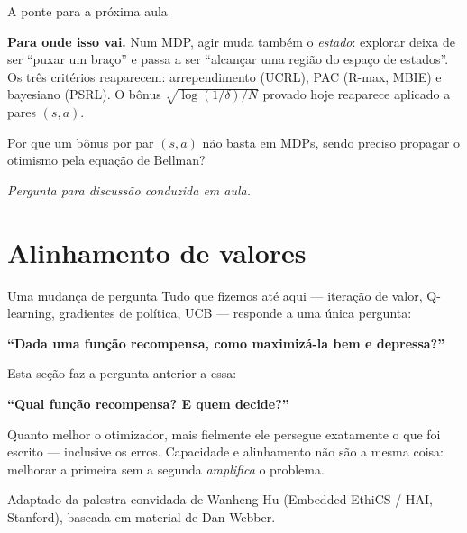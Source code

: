 \documentclass[aspectratio=169, 11pt]{beamer}
\newcommand{\paradiscussao}{\smallskip
  {\footnotesize\color{rlCinza}\itshape Pergunta para discussão conduzida em aula.}}
\begin{document}
\begin{frame}{A ponte para a próxima aula}
  \begin{ideiabox}
    \textbf{Para onde isso vai.} Num MDP, agir muda também o \emph{estado}:
    explorar deixa de ser ``puxar um braço'' e passa a ser ``alcançar uma
    região do espaço de estados''. Os três critérios reaparecem: arrependimento
    (UCRL), PAC (R-max, MBIE) e bayesiano (PSRL). O bônus
    $\sqrt{\log(1/\delta)/N}$ provado hoje reaparece aplicado a pares $(s,a)$.
  \end{ideiabox}

  \begin{quizbox}{}
    Por que um bônus por par $(s,a)$ não basta em MDPs, sendo preciso propagar
    o otimismo pela equação de Bellman?
  \end{quizbox}
  \paradiscussao
\end{frame}

\section{Alinhamento de valores}

\begin{frame}{Uma mudança de pergunta}
  Tudo que fizemos até aqui --- iteração de valor, Q-learning, gradientes de
  política, UCB --- responde a uma única pergunta:

  \begin{center}
    {\large\color{rlAzul}\bfseries ``Dada uma função recompensa, como
    maximizá-la bem e depressa?''}
  \end{center}

  Esta seção faz a pergunta anterior a essa:

  \begin{center}
    {\large\color{rlLaranja}\bfseries ``Qual função recompensa? E quem decide?''}
  \end{center}

  \begin{ideiabox}
    Quanto melhor o otimizador, mais fielmente ele persegue exatamente o que
    foi escrito --- inclusive os erros. Capacidade e alinhamento não são a
    mesma coisa: melhorar a primeira sem a segunda \emph{amplifica} o problema.
  \end{ideiabox}

  {\footnotesize\color{rlCinza} Adaptado da palestra convidada de Wanheng Hu
  (Embedded EthiCS / HAI, Stanford), baseada em material de Dan Webber.}
\end{frame}
\end{document}

